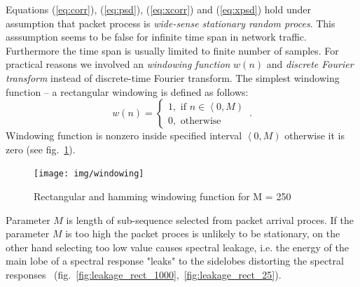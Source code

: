 Equations (\ref{eq:corr}), (\ref{eq:psd}), (\ref{eq:xcorr}) and (\ref{eq:xpsd}) 
hold under assumption that packet process is \emph{wide-sense stationary random proces}.
This asssumption seems to be false for infinite time span in network traffic.
Furthermore the time span is usually limited to finite number of samples.
For practical reasons we involved an \emph{windowing function} $w(n)$ and 
\emph{discrete Fourier transform} instead of discrete-time Fourier transform. 
The simplest windowing function -- a rectangular windowing is defined as follows:
\begin{equation}
w(n) = \left\lbrace \begin{array}{l} 
1, \mbox{ if } n\in \left\langle 0, M \right) \\ 
0, \mbox{ otherwise} \end{array}\right. \,.
\end{equation}
Windowing function is nonzero inside specified interval $\left\langle 0, M \right)$ 
otherwise it is zero (see fig.~\ref{fig:windowing}). 

\begin{figure}[h!]%
  \centering
  \texttt{[image: img/windowing]}
  \caption{\small Rectangular and hamming windowing function for M = 250}
  \label{fig:windowing}
\end{figure}

Parameter  $M$ is length of sub-sequence selected from packet arrival proces. 
If the parameter $M$ is too high the packet proces is unlikely to be stationary, 
on the other hand selecting too low value causes spectral leakage, i.e. the energy 
of the main lobe of a spectral response "leaks" to the sidelobes distorting the 
spectral responses~\cite{kay1981spectrum} 
(fig.~\ref{fig:leakage_rect_1000},~\ref{fig:leakage_rect_25}). 

